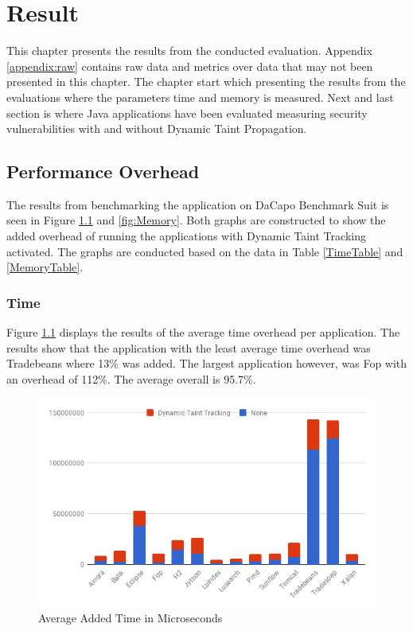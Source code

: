 \chapter{Result}
This chapter presents the results from the conducted evaluation. Appendix \ref{appendix:raw} contains raw data and metrics over data that may not been presented in this chapter. The chapter start which presenting the results from the \textit{} evaluations where the parameters time and memory is measured. Next and last section is \textit{} where Java applications have been evaluated measuring security vulnerabilities with and without Dynamic Taint Propagation.



\section{Performance Overhead}
\label{Performance}
The results from benchmarking the application on DaCapo Benchmark Suit \parencite{dacapo} is seen in Figure \ref{fig:Time} and \ref{fig:Memory}. Both graphs are constructed to show the added overhead of running the applications with Dynamic Taint Tracking activated. The graphs are conducted based on the data in Table \ref{TimeTable} and \ref{MemoryTable}.



\subsection{Time}
Figure \ref{fig:Time} displays the results of the average time overhead per application. The results show that the application with the least average time overhead was Tradebeans where 13\% was added. The largest application however, was Fop with an overhead of 112\%. The average overall is 95.7\%.

\begin{figure}[!hbt]
	\centering
	\includegraphics[width=\textwidth]{images/Time.png}
	\caption{Average Added Time in Microseconds}
	\label{fig:Time}
\end{figure}



